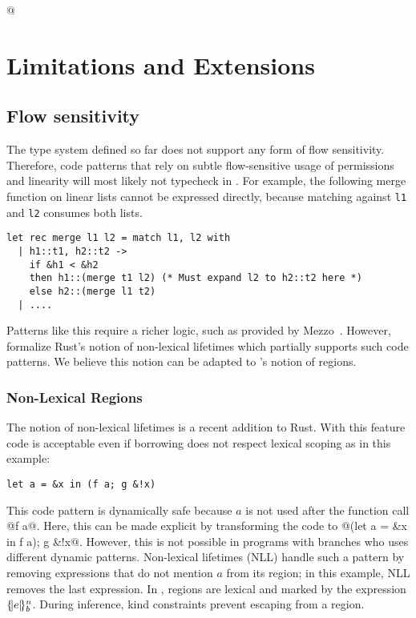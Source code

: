 \lstMakeShortInline[keepspaces,basicstyle=\small\ttfamily]@
\section{Limitations and Extensions}

\subsection{Flow sensitivity}

The type system defined so far does not support any
form of flow sensitivity. Therefore, code patterns that rely on
subtle flow-sensitive usage of permissions and linearity will most likely not
typecheck in \lang. For example, the following merge function on linear lists
cannot be expressed directly, because matching against
\lstinline/l1/ and \lstinline/l2/ consumes both lists.

\begin{lstlisting}
let rec merge l1 l2 = match l1, l2 with
  | h1::t1, h2::t2 ->
    if &h1 < &h2 
    then h1::(merge t1 l2) (* Must expand l2 to h2::t2 here *)
    else h2::(merge l1 t2)
  | ....
\end{lstlisting}

Patterns like this require a richer logic, such as provided by
Mezzo~\citep{DBLP:phd/hal/Protzenko14}.
However,
\citet{DBLP:journals/corr/abs-1903-00982} formalize Rust's
notion of non-lexical lifetimes which partially supports such
code patterns. We believe this notion can be adapted to \lang's notion of
regions.

\subsubsection*{Non-Lexical Regions}

The notion of non-lexical lifetimes is 
a recent addition to Rust.
With this feature code is acceptable even if borrowing does not respect
lexical scoping as in this example:

\begin{lstlisting}[numbers=none]
let a = &x in (f a; g &!x)
\end{lstlisting}

This code pattern is dynamically safe because $a$ is not used after
the function call @f a@.
Here, this can be made explicit by transforming
the code to @(let a = &x in f a); g &!x@. However, this is not possible
in programs with branches who uses different dynamic patterns.
Non-lexical lifetimes (NLL) handle such a pattern by removing expressions
that do not mention $a$ from its region; in this example,  NLL removes
the last expression.
%
In \lang, regions are lexical and marked by the
expression $\region{b}{e}$.
During inference, kind constraints prevent escaping from
a region.

